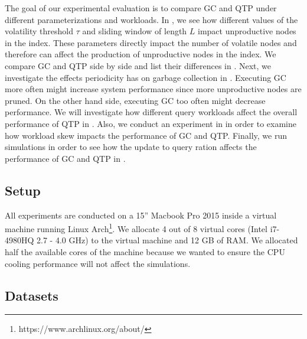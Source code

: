 \documentclass[abstracton,12pt]{scrartcl}
\theoremstyle{definition}
\begin{document}
The goal of our experimental evaluation is to compare GC and QTP under
different parameterizations and workloads.
In , we see how different values of the
volatility threshold $\tau$
and sliding window of length $L$ impact unproductive nodes in the index. These
parameters directly impact the number of volatile nodes and therefore can affect
the production of unproductive nodes in the index. We compare GC and QTP side by
side and list their differences in . Next, we
investigate the effects periodicity has on garbage collection in .
Executing GC more often might increase system
performance since more unproductive nodes are pruned. On the other hand side,
executing GC too often might decrease performance. We will investigate how
different query workloads affect the overall
performance of QTP in . Also, we conduct an
experiment in  in order to examine how
workload skew impacts the performance of GC and QTP. Finally, we run simulations
in order to see how the update to query ration affects the performance of GC and
QTP in .

\subsection{Setup}

All experiments are conducted on a 15'' Macbook Pro 2015 inside
a virtual machine running Linux Arch\footnote{https://www.archlinux.org/about/}.
We allocate 4 out of 8 virtual cores (Intel i7-4980HQ 2.7 - 4.0 GHz) to the virtual
machine and 12 GB of RAM. We allocated half the available cores of the machine
because we wanted to ensure the CPU cooling performance will not affect the simulations.



\subsection{Datasets}
\end{document}
